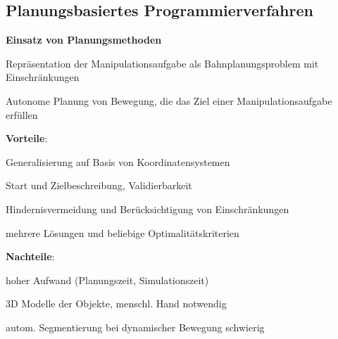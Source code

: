 \subsection{Planungsbasiertes Programmierverfahren}
\textbf{Einsatz von Planungsmethoden}
\begin{compactitem}
    \item Repräsentation der Manipulationsaufgabe als Bahnplanungsproblem mit Einschränkungen
    \item Autonome Planung von Bewegung, die das Ziel einer Manipulationsaufgabe erfüllen
    \item \textbf{Vorteile}:
    \begin{compactitem}
        \item Generalisierung auf Basis von Koordinatensystemen
        \item Start und Zielbeschreibung, Validierbarkeit
        \item Hindernisvermeidung und Berücksichtigung von Einschränkungen
        \item mehrere Lösungen und beliebige Optimalitätskriterien
    \end{compactitem}
    \item \textbf{Nachteile}:
    \begin{compactitem}
        \item hoher Aufwand (Planungszeit, Simulationszeit)
        \item 3D Modelle der Objekte, menschl. Hand notwendig
        \item autom. Segmentierung bei dynamischer Bewegung schwierig
    \end{compactitem}
\end{compactitem}
